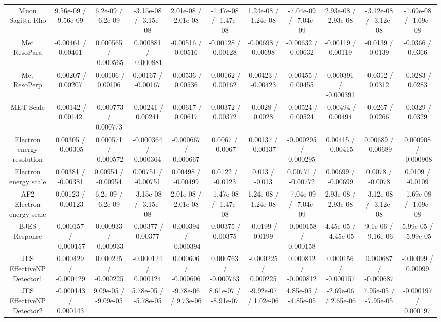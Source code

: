 \begin{table}[htbp]
\begin{center}
\begin{tabular}{|c|c|c|c|c|c|c|c|c|c|c|}
  Muon Sagitta Rho & 9.56e-09 / 9.56e-09 & 6.2e-09 / 6.2e-09 & -3.15e-08 / -3.15e-08 & 2.01e-08 / 2.01e-08 & -1.47e-08 / -1.47e-08 & 1.24e-08 / 1.24e-08 & -7.04e-09 / -7.04e-09 & 2.93e-08 / 2.93e-08 & -3.12e-08 / -3.12e-08 & -1.69e-08 / -1.69e-08 \\ 
  Met ResoPara & -0.00461 / 0.00461 & 0.000565 / -0.000565 & 0.000881 / -0.000881 & -0.00516 / 0.00516 & -0.00128 / 0.00128 & -0.00698 / 0.00698 & -0.00632 / 0.00632 & -0.00119 / 0.00119 & -0.0139 / 0.0139 & -0.0366 / 0.0366 \\ 
  Met ResoPerp & -0.00207 / 0.00207 & -0.00106 / 0.00106 & 0.00167 / -0.00167 & -0.00536 / 0.00536 & -0.00162 / 0.00162 & 0.00423 / -0.00423 & -0.00455 / 0.00455 & 0.000391 / -0.000391 & -0.0312 / 0.0312 & -0.0283 / 0.0283 \\ 
  MET Scale & -0.00142 / 0.00142 & -0.000773 / 0.000773 & -0.00241 / 0.00241 & -0.00617 / 0.00617 & -0.00372 / 0.00372 & -0.0028 / 0.0028 & -0.00524 / 0.00524 & -0.00494 / 0.00494 & -0.0267 / 0.0266 & -0.0329 / 0.0329 \\ 
  Electron energy resolution & 0.00305 / -0.00305 & 0.000571 / -0.000572 & -0.000364 / 0.000364 & -0.000667 / 0.000667 & 0.0067 / -0.0067 & 0.00137 / -0.00137 & -0.000295 / 0.000295 & 0.00415 / -0.00415 & 0.00689 / -0.00689 & 0.000908 / -0.000908 \\ 
  Electron energy scale & 0.00381 / -0.00381 & 0.00954 / -0.00954 & 0.00751 / -0.00751 & 0.00498 / -0.00499 & 0.0122 / -0.0123 & 0.013 / -0.013 & 0.00771 / -0.00772 & 0.00699 / -0.00699 & 0.0078 / -0.0078 & 0.0109 / -0.0109 \\ 
  AF2 Electron energy scale & 0.00123 / -0.00123 & 6.2e-09 / 6.2e-09 & -3.15e-08 / -3.15e-08 & 2.01e-08 / 2.01e-08 & -1.47e-08 / -1.47e-08 & 1.24e-08 / 1.24e-08 & -7.04e-09 / -7.04e-09 & 2.93e-08 / 2.93e-08 & -3.12e-08 / -3.12e-08 & -1.69e-08 / -1.69e-08 \\ 
  BJES Response & 0.000157 / -0.000157 & 0.000933 / -0.000933 & -0.00377 / 0.00377 & 0.000394 / -0.000394 & -0.00375 / 0.00375 & -0.0199 / 0.0199 & -0.000158 / 0.000158 & 4.45e-05 / -4.45e-05 & 9.1e-06 / -9.16e-06 & 5.99e-05 / -5.99e-05 \\ 
  JES EffectiveNP Detector1 & 0.000429 / -0.000429 & 0.000225 / -0.000225 & -0.000124 / 0.000124 & 0.000606 / -0.000606 & 0.000763 / -0.000763 & -0.000225 / 0.000225 & 0.000812 / -0.000812 & 0.000156 / -0.000157 & 0.000687 / -0.000687 & -0.00099 / 0.00099 \\ 
  JES EffectiveNP Detector2 & -0.000143 / 0.000143 & 9.09e-05 / -9.09e-05 & 5.78e-05 / -5.78e-05 & -9.78e-06 / 9.73e-06 & 8.61e-07 / -8.91e-07 & -9.92e-07 / 1.02e-06 & 4.85e-05 / -4.85e-05 & -2.69e-06 / 2.65e-06 & 7.95e-05 / -7.95e-05 & -0.000197 / 0.000197 \\ 

\end{tabular}
\end{center}
\end{table}
